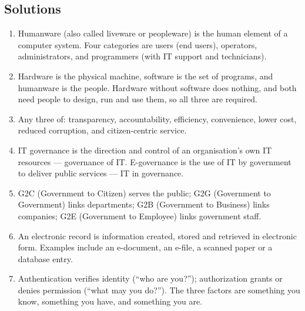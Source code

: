 \documentclass[11pt]{article}
\begin{document}
\subsection*{Solutions}
\begingroup\small
\begin{enumerate}[label=\arabic*.]
  \item Humanware (also called liveware or peopleware) is the human element of
    a computer system. Four categories are users (end users), operators,
    administrators, and programmers (with IT support and technicians).
  \item Hardware is the physical machine, software is the set of programs,
    and humanware is the people. Hardware without software does nothing, and
    both need people to design, run and use them, so all three are required.
  \item Any three of: transparency, accountability, efficiency, convenience,
    lower cost, reduced corruption, and citizen-centric service.
  \item IT governance is the direction and control of an organisation's own
    IT resources --- governance of IT. E-governance is the use of IT by
    government to deliver public services --- IT in governance.
  \item G2C (Government to Citizen) serves the public; G2G (Government to
    Government) links departments; G2B (Government to Business) links
    companies; G2E (Government to Employee) links government staff.
  \item An electronic record is information created, stored and retrieved in
    electronic form. Examples include an e-document, an e-file, a scanned
    paper or a database entry.
  \item Authentication verifies identity (``who are you?''); authorization
    grants or denies permission (``what may you do?''). The three factors are
    something you know, something you have, and something you are.
\end{enumerate}
\endgroup
\end{document}

